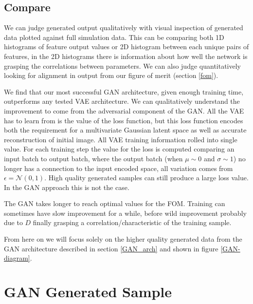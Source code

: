 \documentclass{article}
\begin{document}
    \subsection{Compare}

        We can judge generated output qualitatively with visual inspection of generated data plotted against full simulation data. This can be comparing both 1D histograms of feature output values or 2D histogram between each unique pairs of features, in the 2D histograms there is information about how well the network is grasping the correlations between parameters. We can also judge quantitatively looking for alignment in output from our figure of merit (section \ref{fom}). 
        
        We find that our most successful GAN architecture, given enough training time, outperforms any tested VAE architecture. We can qualitatively understand the improvement to come from the adversarial component of the GAN. All the VAE has to learn from is the value of the loss function, but this loss function encodes both the requirement for a multivariate Gaussian latent space as well as accurate reconstruction of initial image. All VAE training information rolled into single value. For each training step the value for the loss is computed comparing an input batch to output batch, where the output batch (when $\mu\sim0$ and $\sigma\sim1$) no longer has a connection to the input encoded space, all variation comes from  $\epsilon = \mathcal{N} (0, 1)$. High quality generated samples can still produce a large loss value. In the GAN approach this is not the case.
        
        
        The GAN takes longer to reach optimal values for the FOM. Training can sometimes have slow improvement for a while, before wild improvement probably due to $D$ finally grasping a correlation/characteristic of the training sample. 
    
        From here on we will focus solely on the higher quality generated data from the GAN architecture described in section \ref{GAN_arch} and shown in figure \ref{GAN-diagram}.
        
        
\section{GAN Generated Sample}
\end{document}
